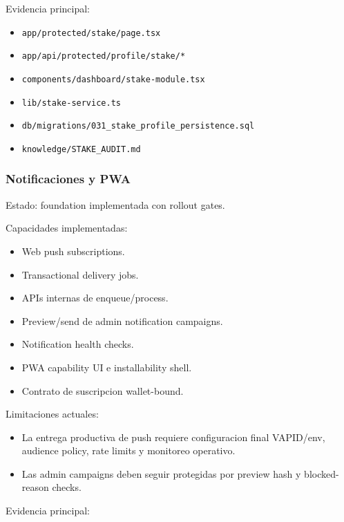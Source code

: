 \documentclass[
  10pt,
  letterpaper,
]{article}
\providecommand{\tightlist}{%
  \setlength{\itemsep}{0pt}\setlength{\parskip}{0pt}}
\let\oldtexttt\texttt
\renewcommand{\texttt}[1]{\oldtexttt{\small #1}}
\begin{document}
Evidencia principal:

\begin{itemize}
\tightlist
\item
  \texttt{app/protected/stake/page.tsx}
\item
  \texttt{app/api/protected/profile/stake/*}
\item
  \texttt{components/dashboard/stake-module.tsx}
\item
  \texttt{lib/stake-service.ts}
\item
  \texttt{db/migrations/031\_stake\_profile\_persistence.sql}
\item
  \texttt{knowledge/STAKE\_AUDIT.md}
\end{itemize}

\subsubsection{Notificaciones y PWA}\label{notificaciones-y-pwa}

Estado: foundation implementada con rollout gates.

Capacidades implementadas:

\begin{itemize}
\tightlist
\item
  Web push subscriptions.
\item
  Transactional delivery jobs.
\item
  APIs internas de enqueue/process.
\item
  Preview/send de admin notification campaigns.
\item
  Notification health checks.
\item
  PWA capability UI e installability shell.
\item
  Contrato de suscripcion wallet-bound.
\end{itemize}

Limitaciones actuales:

\begin{itemize}
\tightlist
\item
  La entrega productiva de push requiere configuracion final VAPID/env,
  audience policy, rate limits y monitoreo operativo.
\item
  Las admin campaigns deben seguir protegidas por preview hash y
  blocked-reason checks.
\end{itemize}

Evidencia principal:
\end{document}
